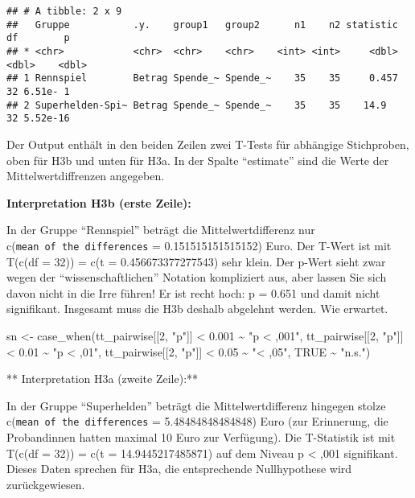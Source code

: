 \documentclass[
]{book}
\newenvironment{Shaded}{\begin{snugshade}}{\end{snugshade}}
\newcommand{\ConstantTok}[1]{\textcolor[rgb]{0.00,0.00,0.00}{#1}}
\newcommand{\DecValTok}[1]{\textcolor[rgb]{0.00,0.00,0.81}{#1}}
\newcommand{\FloatTok}[1]{\textcolor[rgb]{0.00,0.00,0.81}{#1}}
\newcommand{\FunctionTok}[1]{\textcolor[rgb]{0.00,0.00,0.00}{#1}}
\newcommand{\NormalTok}[1]{#1}
\newcommand{\OtherTok}[1]{\textcolor[rgb]{0.56,0.35,0.01}{#1}}
\newcommand{\SpecialCharTok}[1]{\textcolor[rgb]{0.00,0.00,0.00}{#1}}
\newcommand{\StringTok}[1]{\textcolor[rgb]{0.31,0.60,0.02}{#1}}
\begin{document}
\begin{verbatim}
## # A tibble: 2 x 9
##   Gruppe           .y.    group1   group2      n1    n2 statistic    df        p
## * <chr>            <chr>  <chr>    <chr>    <int> <int>     <dbl> <dbl>    <dbl>
## 1 Rennspiel        Betrag Spende_~ Spende_~    35    35     0.457    32 6.51e- 1
## 2 Superhelden-Spi~ Betrag Spende_~ Spende_~    35    35    14.9      32 5.52e-16
\end{verbatim}

Der Output enthält in den beiden Zeilen zwei T-Tests für abhängige Stichproben, oben für H3b und unten für H3a. In der Spalte ``estimate'' sind die Werte der Mittelwertdiffrenzen angegeben.

\textbf{Interpretation H3b (erste Zeile):}

In der Gruppe ``Rennspiel'' beträgt die Mittelwertdifferenz nur c(\texttt{mean\ of\ the\ differences} = 0.151515151515152) Euro. Der T-Wert ist mit T(c(df = 32)) = c(t = 0.456673377277543) sehr klein. Der p-Wert sieht zwar wegen der ``wissenschaftlichen'' Notation kompliziert aus, aber lassen Sie sich davon nicht in die Irre führen! Er ist recht hoch: p = 0.651 und damit nicht signifikant. Insgesamt muss die H3b deshalb abgelehnt werden. Wie erwartet.

\begin{Shaded}
\begin{Highlighting}[]
\NormalTok{sn }\OtherTok{\textless{}{-}} \FunctionTok{case\_when}\NormalTok{(tt\_pairwise[[}\DecValTok{2}\NormalTok{, }\StringTok{"p"}\NormalTok{]] }\SpecialCharTok{\textless{}} \FloatTok{0.001} \SpecialCharTok{\textasciitilde{}} \StringTok{"p \textless{} ,001"}\NormalTok{,}
\NormalTok{                tt\_pairwise[[}\DecValTok{2}\NormalTok{, }\StringTok{"p"}\NormalTok{]] }\SpecialCharTok{\textless{}} \FloatTok{0.01} \SpecialCharTok{\textasciitilde{}} \StringTok{"p \textless{} ,01"}\NormalTok{,}
\NormalTok{                tt\_pairwise[[}\DecValTok{2}\NormalTok{, }\StringTok{"p"}\NormalTok{]] }\SpecialCharTok{\textless{}} \FloatTok{0.05} \SpecialCharTok{\textasciitilde{}} \StringTok{"\textless{} ,05"}\NormalTok{,}
                \ConstantTok{TRUE} \SpecialCharTok{\textasciitilde{}} \StringTok{"n.s."}\NormalTok{)}
\end{Highlighting}
\end{Shaded}

** Interpretation H3a (zweite Zeile):**

In der Gruppe ``Superhelden'' beträgt die Mittelwertdifferenz hingegen stolze c(\texttt{mean\ of\ the\ differences} = 5.48484848484848) Euro (zur Erinnerung, die Probandinnen hatten maximal 10 Euro zur Verfügung). Die T-Statistik ist mit T(c(df = 32)) = c(t = 14.9445217485871) auf dem Niveau p \textless{} ,001 signifikant. Dieses Daten sprechen für H3a, die entsprechende Nullhypothese wird zurückgewiesen.
\end{document}
